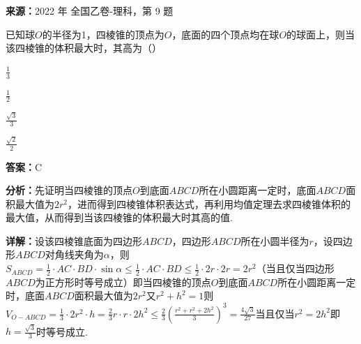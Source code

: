 \begin{question}[points=5]
\textbf{来源：}2022 年 全国乙卷-理科，第 9 题\par
已知球$O$的半径为1，四棱锥的顶点为$O$，底面的四个顶点均在球$O$的球面上，则当该四棱锥的体积最大时，其高为（\qquad）
\begin{choices}
  \item $\frac{1}{3}$
  \item $\frac{1}{2}$
  \item $\frac{\sqrt{3}}{3}$
  \item $\frac{\sqrt{2}}{2}$
\end{choices}
\begin{solution}
\textbf{答案：}C

\textbf{分析：}先证明当四棱锥的顶点$O$到底面$ABCD$所在小圆距离一定时，底面$ABCD$面积最大值为$2r^2$，进而得到四棱锥体积表达式，再利用均值定理去求四棱锥体积的最大值，从而得到当该四棱锥的体积最大时其高的值.

\textbf{详解：}设该四棱锥底面为四边形$ABCD$，四边形$ABCD$所在小圆半径为$r$，设四边形$ABCD$对角线夹角为$\alpha$，则$S_{ABCD} = \frac{1}{2}\cdot AC\cdot BD\cdot\sin\alpha \leq \frac{1}{2}\cdot AC\cdot BD \leq \frac{1}{2}\cdot 2r\cdot 2r = 2r^2$（当且仅当四边形$ABCD$为正方形时等号成立）即当四棱锥的顶点$O$到底面$ABCD$所在小圆距离一定时，底面$ABCD$面积最大值为$2r^2$又$r^2 + h^2 = 1$则$V_{O-ABCD} = \frac{1}{3}\cdot 2r^2\cdot h = \frac{2}{3}r\cdot r\cdot 2h^2 \leq \frac{2}{3}\left(\frac{r^2 + r^2 + 2h^2}{3}\right)^3 = \frac{4\sqrt{3}}{27}$当且仅当$r^2 = 2h^2$即$h = \frac{\sqrt{3}}{3}$时等号成立.
\end{solution}
\end{question}

